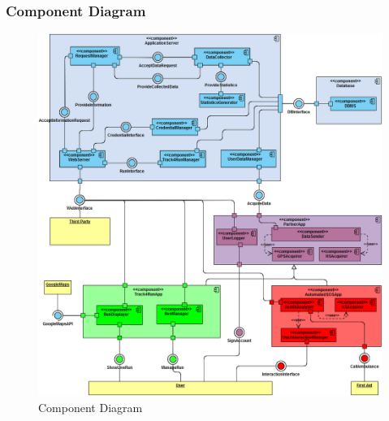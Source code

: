\subsubsection{Component Diagram}
\begin{figure}[H]
\centering
\includegraphics[scale=0.44]{Images/ComponentDiagram.png}
\caption{Component Diagram}
\end{figure}

